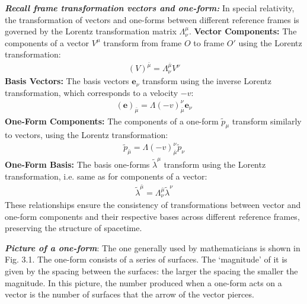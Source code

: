 \documentclass[12pt]{book}
\begin{document}
    \textbf{\textit{Recall frame transformation vectors and one-form:}} In special relativity, the transformation of vectors and one-forms between different reference frames is governed by the Lorentz transformation matrix \(\Lambda^\mu_\nu\).
    \textbf{Vector Components:}
    The components of a vector \(V^\mu\) transform from frame \(O\) to frame \(O'\) using the Lorentz transformation:
    \begin{align}
    (V)^{\bar{\mu}} = \Lambda^{\bar{\mu}}_\nu V^\nu
    \end{align}
    \textbf{Basis Vectors:}
    The basis vectors \(\mathbf{e}_\nu\) transform using the inverse Lorentz transformation, which corresponds to a velocity \(-v\):
    \begin{align}
    (\mathbf{e})_{\bar{\mu}} = \Lambda(-v)^{\nu}_{\bar{\mu}} \mathbf{e}_\nu
    \end{align}
    \textbf{One-Form Components:}
    The components of a one-form \(\tilde{p}_\mu\) transform similarly to vectors, using the Lorentz transformation:
    \begin{align}
    \tilde{p}_{\bar{\mu} }= \Lambda(-v)_{\bar{\mu}}^{\nu} \tilde{p}_\nu
    \end{align}
    \textbf{One-Form Basis:}
    The basis one-forms \(\tilde{\lambda}^\mu\) transform using the Lorentz transformation, i.e. same as for components of a vector:
    \begin{align}
    \tilde{\lambda}^{\bar{\mu} }= \Lambda^{\bar{\mu}}_\nu \tilde{\lambda}^\nu
    \end{align}
    These relationships ensure the consistency of transformations between vector and one-form components and their respective bases across different reference frames, preserving the structure of spacetime.
    
    \textit{\textbf{Picture of a one-form}}: The one generally used by mathematicians is shown in Fig. 3.1. The one-form consists of a series of surfaces. The ‘magnitude’ of it is given by the spacing between the surfaces: the larger the spacing the smaller the magnitude. In this picture, the number produced when a one-form acts on a vector is the number of surfaces that the arrow of the vector pierces.
\end{document}
